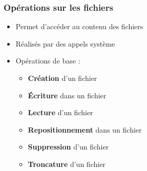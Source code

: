 \begin{frame}
\frametitle{Opérations sur les fichiers}
\begin{itemize}
\item Permet d'accéder au contenu des fichiers
\item Réalisés par des appels système
\item Opérations de base :
\begin{itemize}
\item \textbf{Création} d'un fichier
\item \textbf{Écriture} dans un fichier
\item \textbf{Lecture} d'un fichier
\item \textbf{Repositionnement} dans un fichier
\item \textbf{Suppression} d'un fichier
\item \textbf{Troncature} d'un fichier
\end{itemize}
\end{itemize}
\end{frame}



